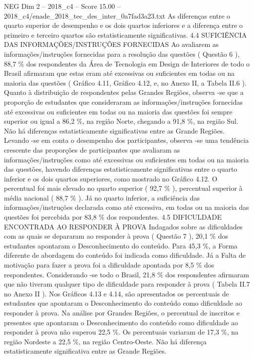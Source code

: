 \begin{textsample}{NEG Dim 2 – 2018\_c4 – Score 15.00 – 2018\_c4/enade\_2018\_tec\_des\_inter\_0a7fad3a23.txt}
As diferenças entre o quarto superior de desempenho e os dois quartos inferiores e a diferença entre o primeiro e terceiro quartos são estatisticamente significativas. 4.4 SUFICIÊNCIA DAS INFORMAÇÕES/INSTRUÇÕES FORNECIDAS Ao avaliarem as informações/instruções fornecidas para a resolução das questões ( Questão 6 ), 88,7 \% dos respondentes da Área de Tecnologia em Design de Interiores de todo o Brasil afirmaram que estas eram até excessivas ou suficientes em todas ou na maioria das questões ( Gráfico 4.11, Gráfico 4.12, e, no Anexo II, a Tabela II.6 ).
Quanto à distribuição de respondentes pelas Grandes Regiões, observa -se que a proporção de estudantes que consideraram as informações/instruções fornecidas até excessivas ou suficientes em todas ou na maioria das questões foi sempre superior ou igual a 86,2 \%, na região Norte, chegando a 91,8 \%, na região Sul.
Não há diferenças estatisticamente significativas entre as Grande Regiões.
Levando -se em conta o desempenho dos participantes, observa -se uma tendência crescente das proporções de participantes que avaliaram as informações/instruções como até excessivas ou suficientes em todas ou na maioria das questões, havendo diferenças estatisticamente significativas entre o quarto inferior e os dois quartos superiores, como mostrado no Gráfico 4.12.
O percentual foi mais elevado no quarto superior ( 92,7 \% ), percentual superior à média nacional ( 88,7 \% ).
Já no quarto inferior, a suficiência das informações/instruções declarada como até excessiva, em todas ou na maioria das questões foi percebida por 83,8 \% dos respondentes. 4.5 DIFICULDADE ENCONTRADA AO RESPONDER À PROVA Indagados sobre as dificuldades com as quais se depararam ao responder à prova ( Questão 7 ), 20,1 \% dos estudantes apontaram o Desconhecimento do conteúdo.
Para 45,3 \%, a Forma diferente de abordagem do conteúdo foi indicada como dificuldade.
Já a Falta de motivação para fazer a prova foi a dificuldade apontada por 8,5 \% dos respondentes.
Considerando -se todo o Brasil, 21,8 \% dos respondentes afirmaram que não tiveram qualquer tipo de dificuldade para responder à prova ( Tabela II.7 no Anexo II ).
Nos Gráficos 4.13 e 4.14, são apresentados os percentuais de estudantes que apontaram o Desconhecimento do conteúdo como dificuldade ao responder à prova.
Na análise por Grandes Regiões, o percentual de inscritos e presentes que apontaram o Desconhecimento do conteúdo como dificuldade ao responder à prova não superou 22,5 \%.
Os percentuais variaram de 17,3 \%, na região Nordeste a 22,5 \%, na região Centro-Oeste.
Não há diferença estatisticamente significativa entre as Grande Regiões.

\end{textsample}
